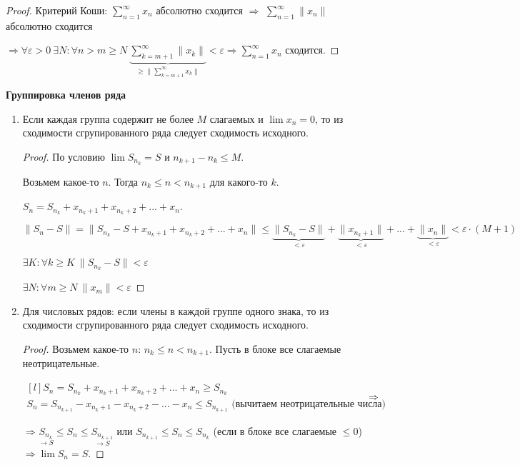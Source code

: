 \begin{proof}
    Критерий Коши: $\sum\limits_{n=1}^\infty x_n$ абсолютно сходится $\Rightarrow$ $\sum\limits_{n=1}^\infty \|x_n\|$ абсолютно сходится 
    
    $\Rightarrow\forall \varepsilon >0\ \exists N: \forall n>m\geq N\ \underbrace{\sum\limits_{k=m+1}^\infty\| x_k\|}_{\geq \|\sum\limits_{k=m+1}^\infty x_k\|}<\varepsilon\Rightarrow \sum\limits_{n=1}^\infty x_n $ сходится.
\end{proof}

\begin{theorem}
    \textbf{Группировка членов ряда}

    \begin{enumerate}
        \item Если каждая группа содержит не более $M$ слагаемых и $\lim x_n=0$, то из сходимости сгрупированного ряда следует сходимость исходного.

        \begin{proof}
            По условию $\lim S_{n_k}=S$ и $n_{k+1}-n_k\leq M$.

            Возьмем какое-то $n$. Тогда $n_k\leq n<n_{k+1}$ для какого-то $k$.

            $S_n=S_{n_k}+x_{n_k+1}+x_{n_k+2}+...+x_n$.

            $\|S_n-S\|=\|S_{n_k}-S+x_{n_k+1}+x_{n_k+2}+...+x_n\|\leq \underbrace{\|S_{n_k}-S\|}_{<\varepsilon}+\underbrace{\|x_{n_k+1}\|}_{<\varepsilon}+...+\underbrace{\|x_n\|}_{<\varepsilon}<\varepsilon\cdot (M+1)$

            $\exists K: \forall k\geq K\ \|S_{n_k}-S\|<\varepsilon$

            $\exists N: \forall m\geq N\ \|x_m\|<\varepsilon$
        \end{proof}

        \item Для числовых рядов: если члены в каждой группе одного знака, то из сходимости сгрупированного ряда следует сходимость исходного.

        \begin{proof}
            Возьмем какое-то $n$: $n_k\leq n<n_{k+1}$. Пусть в блоке все слагаемые неотрицательные.


            $\begin{matrix*}[l]
                S_n=S_{n_k}+x_{n_k+1}+x_{n_k+2}+...+x_n\geq S_{n_k} \\
                S_n=S_{n_{k+1}}-x_{n_k+1}-x_{n_k+2}-...-x_n\leq S_{n_{k+1}}\text{ (вычитаем неотрицательные числа)}
            \end{matrix*}\Rightarrow$
            
            $\Rightarrow\underset{\rightarrow S}{S_{n_k}}\leq S_n\leq \underset{\rightarrow S}{S_{n_{k+1}}}$ или $S_{n_{k+1}}\leq S_n\leq S_{n_{k}}$ (если в блоке все слагаемые $\leq 0$)$\Rightarrow \lim S_n=S$.
        \end{proof}
    \end{enumerate}
\end{theorem}


